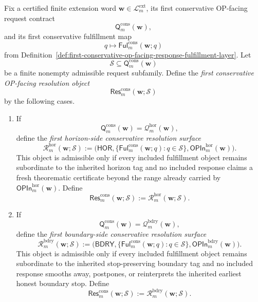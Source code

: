 \begin{definition}
\label{def:first-conservative-op-facing-response-aggregation-resolution-layer}
Fix a certified finite extension word \(\mathbf w\in\mathcal L^{\mathrm{ext}}_{m}\), its first conservative OP-facing request contract
\[
  \mathsf{Q}^{\mathrm{cons}}_{m}(\mathbf w),
\]
and its first conservative fulfillment map
\[
  q\mapsto \mathsf{Ful}^{\mathrm{cons}}_{m}(\mathbf w;q)
\]
from Definition~\ref{def:first-conservative-op-facing-response-fulfillment-layer}. Let
\[
  \mathcal S \subseteq \mathsf{Q}^{\mathrm{cons}}_{m}(\mathbf w)
\]
be a finite nonempty admissible request subfamily. Define the \emph{first conservative OP-facing resolution object}
\[
  \mathsf{Res}^{\mathrm{cons}}_{m}(\mathbf w;\mathcal S)
\]
by the following cases.
\begin{enumerate}[label=(\roman*)]
  \item If
  \[
    \mathsf{Q}^{\mathrm{cons}}_{m}(\mathbf w)=\mathcal Q^{\mathrm{hor}}_{m}(\mathbf w),
  \]
  define the \emph{first horizon-side conservative resolution surface}
  \[
    \mathcal R^{\mathrm{hor}}_{m}(\mathbf w;\mathcal S)
    :=
    \bigl(\mathsf{HOR},\{\mathsf{Ful}^{\mathrm{cons}}_{m}(\mathbf w;q):q\in\mathcal S\},\mathsf{OPIn}^{\mathrm{hor}}_{m}(\mathbf w)\bigr).
  \]
  This object is admissible only if every included fulfillment object remains subordinate to the inherited horizon tag and no included response claims a fresh theorematic certificate beyond the range already carried by \(\mathsf{OPIn}^{\mathrm{hor}}_{m}(\mathbf w)\). Define
  \[
    \mathsf{Res}^{\mathrm{cons}}_{m}(\mathbf w;\mathcal S)
    :=
    \mathcal R^{\mathrm{hor}}_{m}(\mathbf w;\mathcal S).
  \]
  \item If
  \[
    \mathsf{Q}^{\mathrm{cons}}_{m}(\mathbf w)=\mathcal Q^{\mathrm{bdry}}_{m}(\mathbf w),
  \]
  define the \emph{first boundary-side conservative resolution surface}
  \[
    \mathcal R^{\mathrm{bdry}}_{m}(\mathbf w;\mathcal S)
    :=
    \bigl(\mathsf{BDRY},\{\mathsf{Ful}^{\mathrm{cons}}_{m}(\mathbf w;q):q\in\mathcal S\},\mathsf{OPIn}^{\mathrm{bdry}}_{m}(\mathbf w)\bigr).
  \]
  This object is admissible only if every included fulfillment object remains subordinate to the inherited stop-preserving boundary tag and no included response smooths away, postpones, or reinterprets the inherited earliest honest boundary stop. Define
  \[
    \mathsf{Res}^{\mathrm{cons}}_{m}(\mathbf w;\mathcal S)
    :=
    \mathcal R^{\mathrm{bdry}}_{m}(\mathbf w;\mathcal S).
  \]
\end{enumerate}
\end{definition}


